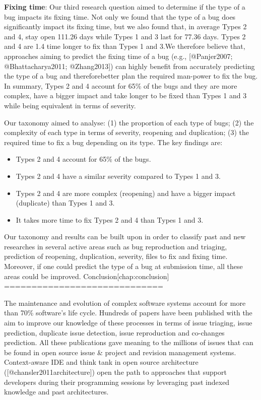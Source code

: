 {\textbf{Fixing time}}: Our third research question aimed to determine
if the type of a bug impacts its fixing time. Not only we found that the
type of a bug does significantly impact its fixing time, but we also
found that, in average Types 2 and 4, stay open 111.26 days while Types
1 and 3 last for 77.36 days. Types 2 and 4 are 1.4 time longer to fix
than Types 1 and 3.We therefore believe that, approaches aiming to
predict the fixing time of a bug (e.g., {[}@Panjer2007;
@Bhattacharya2011; @Zhang2013{]}) can highly benefit from accurately
predicting the type of a bug and thereforebetter plan the required
man-power to fix the bug. In summary, Types 2 and 4 account for 65\% of
the bugs and they are more complex, have a bigger impact and take longer
to be fixed than Types 1 and 3 while being equivalent in terms of
severity.

Our taxonomy aimed to analyse: (1) the proportion of each type of bugs;
(2) the complexity of each type in terms of severity, reopening and
duplication; (3) the required time to fix a bug depending on its type.
The key findings are:

\begin{itemize}
\item
  Types 2 and 4 account for 65\% of the bugs.
\item
  Types 2 and 4 have a similar severity compared to Types 1 and 3.
\item
  Types 2 and 4 are more complex (reopening) and have a bigger impact
  (duplicate) than Types 1 and 3.
\item
  It takes more time to fix Types 2 and 4 than Types 1 and 3.
\end{itemize}

Our taxonomy and results can be built upon in order to classify past and
new researches in several active areas such as bug reproduction and
triaging, prediction of reopening, duplication, severity, files to fix
and fixing time. Moreover, if one could predict the type of a bug at
submission time, all these areas could be improved.
Conclusion{[}chap:conclusion{]} =============================

The maintenance and evolution of complex software systems account for
more than 70\% software's life cycle. Hundreds of papers have been
published with the aim to improve our knowledge of these processes in
terms of issue triaging, issue prediction, duplicate issue detection,
issue reproduction and co-changes prediction. All these publications
gave meaning to the millions of issues that can be found in open source
issue \& project and revision management systems. Context-aware IDE and
think tank in open source architecture ({[}@chansler2011architecture{]})
open the path to approaches that support developers during their
programming sessions by leveraging past indexed knowledge and past
architectures.

